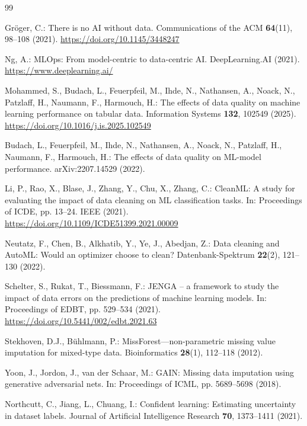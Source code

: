 \documentclass[runningheads]{llncs}
\begin{document}

\begin{thebibliography}{99}

Gröger, C.:
There is no AI without data.
Communications of the ACM \textbf{64}(11), 98--108 (2021).
\url{https://doi.org/10.1145/3448247}

Ng, A.:
MLOps: From model-centric to data-centric AI.
DeepLearning.AI (2021).
\url{https://www.deeplearning.ai/}

Mohammed, S., Budach, L., Feuerpfeil, M., Ihde, N., Nathansen, A.,
Noack, N., Patzlaff, H., Naumann, F., Harmouch, H.:
The effects of data quality on machine learning performance on tabular data.
Information Systems \textbf{132}, 102549 (2025).
\url{https://doi.org/10.1016/j.is.2025.102549}

Budach, L., Feuerpfeil, M., Ihde, N., Nathansen, A., Noack, N.,
Patzlaff, H., Naumann, F., Harmouch, H.:
The effects of data quality on ML-model performance.
arXiv:2207.14529 (2022).

Li, P., Rao, X., Blase, J., Zhang, Y., Chu, X., Zhang, C.:
CleanML: A study for evaluating the impact of data cleaning
on ML classification tasks.
In: Proceedings of ICDE, pp. 13--24. IEEE (2021).
\url{https://doi.org/10.1109/ICDE51399.2021.00009}

Neutatz, F., Chen, B., Alkhatib, Y., Ye, J., Abedjan, Z.:
Data cleaning and AutoML: Would an optimizer choose to clean?
Datenbank-Spektrum \textbf{22}(2), 121--130 (2022).

Schelter, S., Rukat, T., Biessmann, F.:
JENGA -- a framework to study the impact of data errors on the
predictions of machine learning models.
In: Proceedings of EDBT, pp. 529--534 (2021).
\url{https://doi.org/10.5441/002/edbt.2021.63}

Stekhoven, D.J., Bühlmann, P.:
MissForest—non-parametric missing value imputation for
mixed-type data.
Bioinformatics \textbf{28}(1), 112--118 (2012).

Yoon, J., Jordon, J., van der Schaar, M.:
GAIN: Missing data imputation using generative adversarial nets.
In: Proceedings of ICML, pp. 5689--5698 (2018).

Northcutt, C., Jiang, L., Chuang, I.:
Confident learning: Estimating uncertainty in dataset labels.
Journal of Artificial Intelligence Research \textbf{70}, 1373--1411 (2021).


\end{thebibliography}
\end{document}
